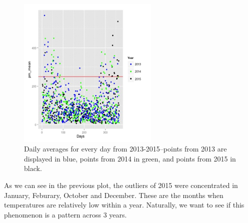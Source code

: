 \documentclass[11pt]{article} %
\begin{document}
 \begin{figure}[!ht]
  \centering
    \includegraphics[width=0.6\textwidth]{Figure2-5}
      \caption{Daily averages for every day from 2013-2015--points from 2013 are displayed in blue, points from 2014 in green, and points from 2015 in black.}
\end{figure}

As we can see in the previous plot, the outliers of 2015 were concentrated in January, Feburary, October and December. These are the months when temperatures are relatively low within a year. Naturally, we want to see if this phenomenon is a pattern across 3 years. 
\end{document}
